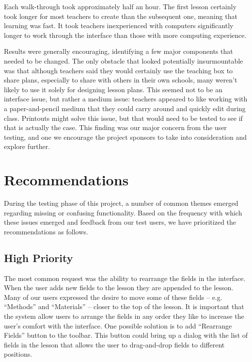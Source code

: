 \documentclass[10pt,letter]{article}
\begin{document}
Each walk-through took approximately half an hour.  The first lesson certainly
took longer for most teachers to create than the subsequent one, meaning that
learning was fast.  It took teachers inexperienced with computers significantly
longer to work through the interface than those with more computing experience.

Results were generally encouraging, identifying a few major components that
needed to be changed.  The only obstacle that looked potentially insurmountable
was that although teachers said they would certainly use the teaching box to
share plans, especially to share with others in their own schools, many weren't
likely to use it solely for designing lesson plans.  This seemed not to be an
interface issue, but rather a medium issue: teachers appeared to like working
with a paper-and-pencil medium that they could carry around and quickly edit
during class.  Printouts might solve this issue, but that would need to be
tested to see if that is actually the case. This finding was our major concern
from the user testing, and one we encourage the project sponsors to take into
consideration and explore further.

\section{Recommendations}
\label{recommendations}
During the testing phase of this project, a number of common themes emerged
regarding missing or confusing functionality. Based on the frequency with which
these issues emerged and feedback from our test users, we have prioritized the
recommendations as follows.

\subsection{High Priority}
The most common request was the ability to rearrange the fields in the
interface. When the user adds new fields to the lesson they are appended to the
lesson. Many of our users expressed the desire to move some of these fields --
e.g. ``Methods'' and ``Materials'' -- closer to the top of the lesson. It is
important that the system allow users to arrange the fields in any order they
like to increase the user's comfort with the interface. One possible solution is
to add ``Rearrange Fields'' button to the toolbar. This button could bring up a
dialog with the list of fields in the lesson that allows the user to
drag-and-drop fields to different positions.
\end{document}
